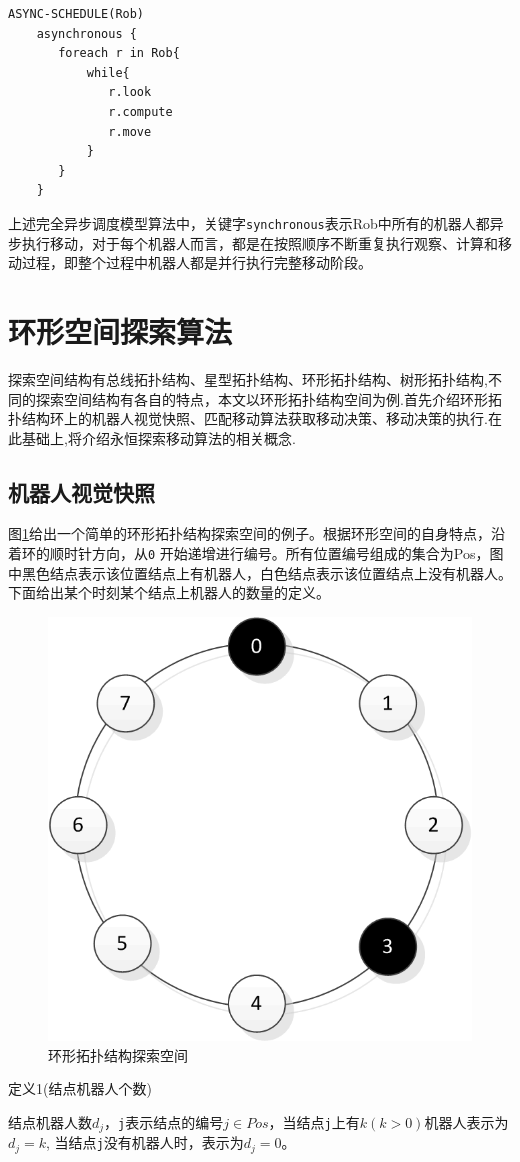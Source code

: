 \begin{lstlisting}
ASYNC-SCHEDULE(Rob)
    asynchronous {
       foreach r in Rob{
           while{
              r.look
              r.compute
              r.move
           }
       }
    }
\end{lstlisting}

上述完全异步调度模型算法中，关键字\verb|synchronous|表示Rob中所有的机器人都异步执行移动，对于每个机器人而言，都是在按照顺序不断重复执行观察、计算和移动过程，即整个过程中机器人都是并行执行完整移动阶段。

\section{环形空间探索算法}
探索空间结构有总线拓扑结构、星型拓扑结构、环形拓扑结构、树形拓扑结构,不同的探索空间结构有各自的特点，本文以环形拓扑结构空间为例.首先介绍环形拓扑结构环上的机器人视觉快照、匹配移动算法获取移动决策、移动决策的执行.在此基础上,将介绍永恒探索移动算法的相关概念.

\subsection{机器人视觉快照}
图\ref{fig:ring}给出一个简单的环形拓扑结构探索空间的例子。根据环形空间的自身特点，沿着环的顺时针方向，从\verb|0| 开始递增进行编号。所有位置编号组成的集合为Pos，图中黑色结点表示该位置结点上有机器人，白色结点表示该位置结点上没有机器人。下面给出某个时刻某个结点上机器人的数量的定义。

\begin{figure}[!hbt]
	\centering
	\includegraphics[width=2 in]{fig/ring.png}
	\caption{环形拓扑结构探索空间}
	\label{fig:ring}
\end{figure}

\begin{bfseries} 定义1\quad(结点机器人个数)\end{bfseries}结点机器人数$d_j$，\verb|j|表示结点的编号$j \in Pos $，当结点\verb|j|上有$k \left(k > 0\right)$机器人表示为$d_j = k$, 当结点\verb|j|没有机器人时，表示为$d_j = 0$。
\\

